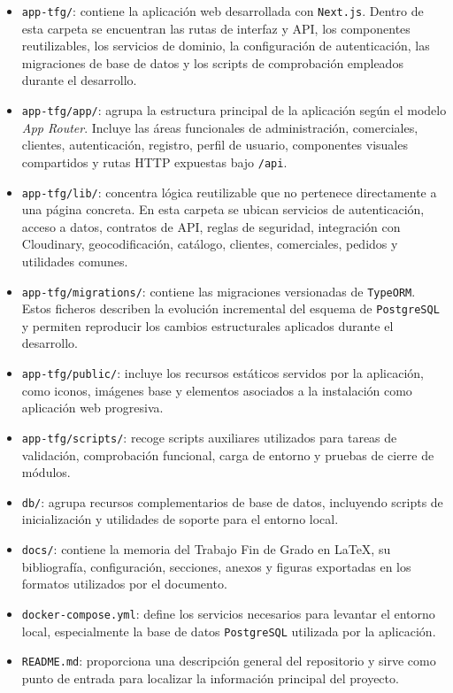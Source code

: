 \begin{itemize}
    \item \texttt{app-tfg/}: contiene la aplicación web desarrollada con \texttt{Next.js}. Dentro de esta carpeta se encuentran las rutas de interfaz y API, los componentes reutilizables, los servicios de dominio, la configuración de autenticación, las migraciones de base de datos y los scripts de comprobación empleados durante el desarrollo.
    \item \texttt{app-tfg/app/}: agrupa la estructura principal de la aplicación según el modelo \textit{App Router}. Incluye las áreas funcionales de administración, comerciales, clientes, autenticación, registro, perfil de usuario, componentes visuales compartidos y rutas HTTP expuestas bajo \texttt{/api}.
    \item \texttt{app-tfg/lib/}: concentra lógica reutilizable que no pertenece directamente a una página concreta. En esta carpeta se ubican servicios de autenticación, acceso a datos, contratos de API, reglas de seguridad, integración con Cloudinary, geocodificación, catálogo, clientes, comerciales, pedidos y utilidades comunes.
    \item \texttt{app-tfg/migrations/}: contiene las migraciones versionadas de \texttt{TypeORM}. Estos ficheros describen la evolución incremental del esquema de \texttt{PostgreSQL} y permiten reproducir los cambios estructurales aplicados durante el desarrollo.
    \item \texttt{app-tfg/public/}: incluye los recursos estáticos servidos por la aplicación, como iconos, imágenes base y elementos asociados a la instalación como aplicación web progresiva.
    \item \texttt{app-tfg/scripts/}: recoge scripts auxiliares utilizados para tareas de validación, comprobación funcional, carga de entorno y pruebas de cierre de módulos.
    \item \texttt{db/}: agrupa recursos complementarios de base de datos, incluyendo scripts de inicialización y utilidades de soporte para el entorno local.
    \item \texttt{docs/}: contiene la memoria del Trabajo Fin de Grado en \LaTeX, su bibliografía, configuración, secciones, anexos y figuras exportadas en los formatos utilizados por el documento.
    \item \texttt{docker-compose.yml}: define los servicios necesarios para levantar el entorno local, especialmente la base de datos \texttt{PostgreSQL} utilizada por la aplicación.
    \item \texttt{README.md}: proporciona una descripción general del repositorio y sirve como punto de entrada para localizar la información principal del proyecto.
\end{itemize}

